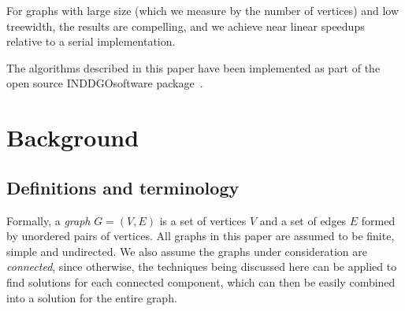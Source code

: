 \documentclass[conference]{IEEEtran}
\begin{document}
For graphs with large size (which we measure by the number of vertices) and low treewidth, the results are compelling, and we achieve near linear speedups relative to a serial implementation. 



The algorithms described in this paper have been implemented as part of the
open source INDDGO\footnotemark software package~\cite{inddgo}.



\section{Background}

\subsection{Definitions and terminology}
Formally, a {\em graph} $G=(V,E)$ is a set of vertices $V$ and a set of edges $E$ formed by unordered pairs of vertices. All graphs in this paper are assumed to be finite, simple and undirected. We also assume the graphs under consideration are {\em connected}, since otherwise, the techniques being discussed here can be applied to find solutions for each connected component, which can then be easily combined into a solution for the entire graph.
\end{document}
